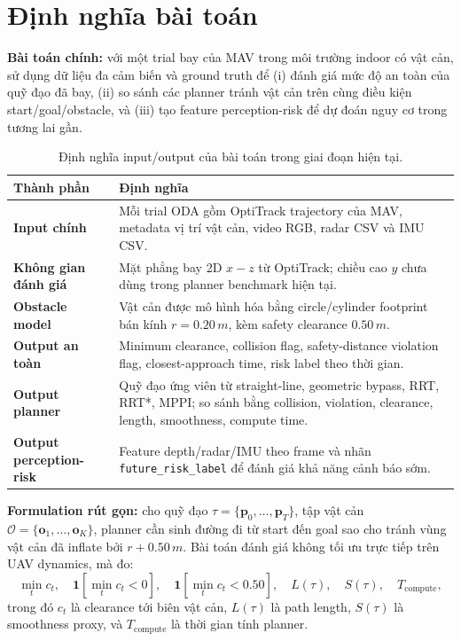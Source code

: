 \documentclass[10pt,a4paper]{article}
\newcommand{\code}[1]{\texttt{#1}}
\begin{document}
\section{Định nghĩa bài toán}

\textbf{Bài toán chính:} với một trial bay của MAV trong môi trường indoor có vật cản, sử dụng dữ liệu đa cảm biến và ground truth để (i) đánh giá mức độ an toàn của quỹ đạo đã bay, (ii) so sánh các planner tránh vật cản trên cùng điều kiện start/goal/obstacle, và (iii) tạo feature perception-risk để dự đoán nguy cơ trong tương lai gần.

\begin{table}[H]
\centering
\small
\caption{Định nghĩa input/output của bài toán trong giai đoạn hiện tại.}
\begin{tabularx}{0.98\linewidth}{>{\bfseries}p{3.2cm} X}
\toprule
Thành phần & Định nghĩa \\
\midrule
Input chính & Mỗi trial ODA gồm OptiTrack trajectory của MAV, metadata vị trí vật cản, video RGB, radar CSV và IMU CSV. \\
Không gian đánh giá & Mặt phẳng bay 2D \(x-z\) từ OptiTrack; chiều cao \(y\) chưa dùng trong planner benchmark hiện tại. \\
Obstacle model & Vật cản được mô hình hóa bằng circle/cylinder footprint bán kính \(r=0.20\,m\), kèm safety clearance \(0.50\,m\). \\
Output an toàn & Minimum clearance, collision flag, safety-distance violation flag, closest-approach time, risk label theo thời gian. \\
Output planner & Quỹ đạo ứng viên từ straight-line, geometric bypass, RRT, RRT*, MPPI; so sánh bằng collision, violation, clearance, length, smoothness, compute time. \\
Output perception-risk & Feature depth/radar/IMU theo frame và nhãn \code{future\_risk\_label} để đánh giá khả năng cảnh báo sớm. \\
\bottomrule
\end{tabularx}
\end{table}

\textbf{Formulation rút gọn:} cho quỹ đạo \(\tau=\{\mathbf{p}_0,\ldots,\mathbf{p}_T\}\), tập vật cản \(\mathcal{O}=\{\mathbf{o}_1,\ldots,\mathbf{o}_K\}\), planner cần sinh đường đi từ start đến goal sao cho tránh vùng vật cản đã inflate bởi \(r+0.50\,m\). Bài toán đánh giá không tối ưu trực tiếp trên UAV dynamics, mà đo:
\[
\min_t c_t,\quad \mathbf{1}[\min_t c_t<0],\quad \mathbf{1}[\min_t c_t<0.50],\quad L(\tau),\quad S(\tau),\quad T_{\mathrm{compute}},
\]
trong đó \(c_t\) là clearance tới biên vật cản, \(L(\tau)\) là path length, \(S(\tau)\) là smoothness proxy, và \(T_{\mathrm{compute}}\) là thời gian tính planner.
\end{document}
